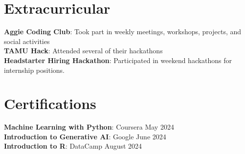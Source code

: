 \documentclass[letterpaper,11pt]{article}
\begin{document}
\section{Extracurricular}
 \begin{itemize}[leftmargin=0.15in, label={}]
    \small{\item{
     \textbf{Aggie Coding Club}{: Took part in weekly meetings, workshops, projects, and social activities} \\
     \textbf{TAMU Hack}{: Attended several of their hackathons} \\
     \textbf{Headstarter Hiring Hackathon}{: Participated in weekend hackathons for internship positions.} \\
    }}
  \end{itemize}

\section{Certifications}
\begin{itemize}[leftmargin=0.15in, label={}]
   \small{\item{
    \textbf{Machine Learning with Python}{: Coursera May 2024} \\
    \textbf{Introduction to Generative AI}{: Google June 2024} \\
    \textbf{Introduction to R}{: DataCamp August 2024} \\
   }}
 \end{itemize}
\end{document}
